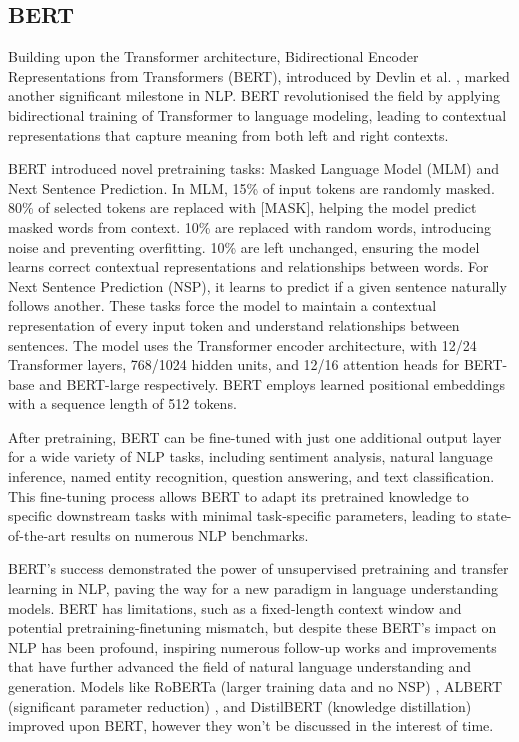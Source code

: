 \documentclass[a4paper, oneside]{discothesis}
\begin{document}
\subsection{BERT}
Building upon the Transformer architecture, Bidirectional Encoder Representations from Transformers (BERT), introduced by Devlin et al. \cite{devlin2018bert}, marked another significant milestone in NLP. BERT revolutionised the field by applying bidirectional training of Transformer to language modeling, leading to contextual representations that capture meaning from both left and right contexts.

BERT introduced novel pretraining tasks: Masked Language Model (MLM) and Next Sentence Prediction. In MLM, 15\% of input tokens are randomly masked. 80\% of selected tokens are replaced with [MASK], helping the model predict masked words from context. 10\% are replaced with random words, introducing noise and preventing overfitting. 10\% are left unchanged, ensuring the model learns correct contextual representations and relationships between words. For Next Sentence Prediction (NSP), it learns to predict if a given sentence naturally follows another. These tasks force the model to maintain a contextual representation of every input token and understand relationships between sentences.
The model uses the Transformer encoder architecture, with 12/24 Transformer layers, 768/1024 hidden units, and 12/16 attention heads for BERT-base and BERT-large respectively. BERT employs learned positional embeddings with a sequence length of 512 tokens.

After pretraining, BERT can be fine-tuned with just one additional output layer for a wide variety of NLP tasks, including sentiment analysis, natural language inference, named entity recognition, question answering, and text classification. 
This fine-tuning process allows BERT to adapt its pretrained knowledge to specific downstream tasks with minimal task-specific parameters, leading to state-of-the-art results on numerous NLP benchmarks.

BERT's success demonstrated the power of unsupervised pretraining and transfer learning in NLP, paving the way for a new paradigm in language understanding models. BERT has limitations, such as a fixed-length context window and potential pretraining-finetuning mismatch, but despite these BERT's impact on NLP has been profound, inspiring numerous follow-up works and improvements that have further advanced the field of natural language understanding and generation. Models like RoBERTa (larger training data and no NSP) \cite{liu2019roberta}, ALBERT (significant parameter reduction) \cite{lan2019albert}, and DistilBERT (knowledge distillation) \cite{sanh2019distilbert} improved upon BERT, however they won't be discussed in the interest of time. 
\end{document}
